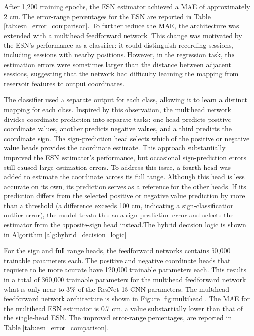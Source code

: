 After 1,200 training epochs, the ESN estimator achieved a MAE of approximately 2 cm. The error-range percentages for the ESN are reported in Table \ref{tab:esn_error_comparison}. To further reduce the MAE, the architecture was extended with a multihead feedforward network. This change was motivated by the ESN's performance as a classifier: it could distinguish recording sessions, including sessions with nearby positions. However, in the regression task, the estimation errors were sometimes larger than the distance between adjacent sessions, suggesting that the network had difficulty learning the mapping from reservoir features to output coordinates.

The classifier used a separate output for each class, allowing it to learn a distinct mapping for each class. Inspired by this observation, the multihead network divides coordinate prediction into separate tasks: one head predicts positive coordinate values, another predicts negative values, and a third predicts the coordinate sign. The sign-prediction head selects which of the positive or negative value heads provides the coordinate estimate. This approach substantially improved the ESN estimator's performance, but occasional sign-prediction errors still caused large estimation errors. To address this issue, a fourth head was added to estimate the coordinate across its full range. Although this head is less accurate on its own, its prediction serves as a reference for the other heads. If its prediction differs from the selected positive or negative value prediction by more than a threshold (a difference exceeds 100 cm, indicating a sign-classification outlier error), the model treats this as a sign-prediction error and selects the estimator from the opposite-sign head instead.The hybrid decision logic is shown in Algorithm \ref{alg:hybrid_decision_logic}.

For the sign and full range heads, the feedforward networks contains 60,000 trainable parameters each. The positive and negative coordinate heads that requiere to be more acurate have 120,000 trainable parameters each. This results in a total of 360,000 trainable parameters for the multihead feedforward network what is only near to 3\% of the ResNet-18 CNN parameters. The multihead feedforward network architecture is shown in Figure \ref{fig:multihead}. The MAE for the multihead ESN estimator is 0.7 cm, a value substantially lower than that of the single-head ESN. The improved error-range percentages, are reported in Table \ref{tab:esn_error_comparison}.


